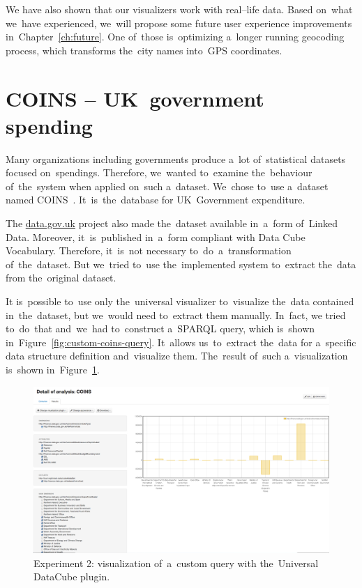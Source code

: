 We have also shown that our visualizers work with real--life data. Based on~what we~have experienced, we~will propose some future user experience 
improvements in~Chapter~\ref{ch:future}. One of~those is~optimizing a~longer running 
geocoding process, which transforms the~city names into~GPS coordinates.

\section{COINS -- UK~government spending}
Many organizations including governments produce a~lot of~statistical datasets 
focused on~spendings. Therefore, we~wanted to~examine the~behaviour of~the~system when applied on~such a~dataset. We~chose to~use a~dataset named 
COINS~\cite{coins}. It~is~the~database for UK~Government expenditure.

The \url{data.gov.uk} project also made the~dataset available in~a~form of~Linked 
Data. Moreover, it~is~published in~a~form compliant with Data Cube Vocabulary.
Therefore, it~is~not necessary to~do~a~transformation of~the~dataset. But we~tried to~use the~implemented system to~extract the~data from the~original 
dataset.

It is~possible to~use only the~universal visualizer to~visualize the~data 
contained in~the~dataset, but we~would need to~extract them manually. In~fact, 
we tried to~do~that and~we~had to~construct a~SPARQL query, which is~shown
in~Figure~\ref{fig:custom-coins-query}. It~allows us~to~extract the~data for a~specific data structure 
definition and~visualize them. The~result of~such a~visualization is~shown in~Figure~\ref{fig:payola-exp-02}. 

\begin{figure}
  \centering
  \includegraphics[width=140mm]{img/payola-exp-02.png}
  \caption{Experiment 2: visualization of~a~custom query with the~Universal DataCube plugin.}
  \label{fig:payola-exp-02}
\end{figure}

